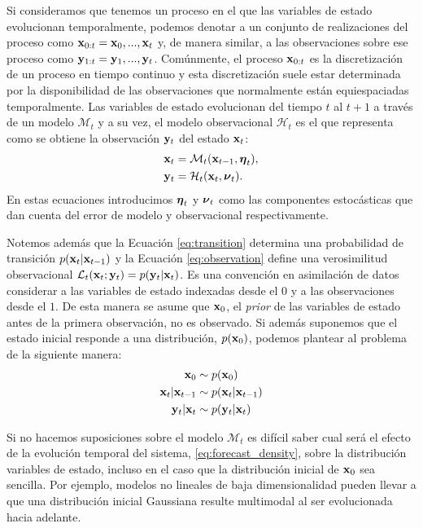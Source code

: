 Si consideramos que tenemos un proceso en el que las variables de estado evolucionan temporalmente, podemos denotar a un conjunto de realizaciones del proceso como $\mathbf{x}_{0:t} = \mathbf{x}_0, ..., \mathbf{x}_t$ y, de manera similar, a las observaciones sobre ese proceso como $\mathbf{y}_{1:t} = \mathbf{y}_1, ..., \mathbf{y}_t$. Comúnmente, el proceso $\mathbf{x}_{0:t}$ es la discretización de un proceso en tiempo continuo y esta discretización suele estar determinada por la disponibilidad de las observaciones que normalmente están equiespaciadas temporalmente. Las variables de estado evolucionan del tiempo $t$ al $t+1$ a través de un modelo $\mathcal{M}_t$ y a su vez, el modelo observacional $\mathcal{H}_t$ es el que representa como se obtiene la observación $\mathbf{y}_t$ del estado $\mathbf{x}_t$: 
\begin{align}
    \mathbf{x}_t &= \mathcal M_{t} (\mathbf{x}_{t-1}, \mbox{\boldmath$ \eta $}_t), \label{eq:transition} \\
    \mathbf{y}_t &= \mathcal H_{t} (\mathbf{x}_t, \mbox{\boldmath$ \nu $}_t). \label{eq:observation}
\end{align}
En estas ecuaciones introducimos $\mbox{\boldmath$ \eta $}_t$ y $\mbox{\boldmath$ \nu $}_t$ como las componentes estocásticas que dan cuenta del error de modelo y observacional respectivamente.

Notemos además que la Ecuación \ref{eq:transition} determina una probabilidad de transición $p(\mathbf{x}_t | \mathbf{x}_{t-1})$ y la Ecuación \ref{eq:observation} define una verosimilitud observacional $\mathcal{L}_t(\mathbf{x}_t ; \mathbf{y}_t) = p(\mathbf{y}_t | \mathbf{x}_t)$. Es una convención en asimilación de datos considerar a las variables de estado indexadas desde el $0$ y a las observaciones desde el $1$. De esta manera se asume que $\mathbf{x}_0$, el \textit{prior} de las variables de estado antes de la primera observación, no es observado. Si además suponemos que el estado inicial responde a una distribución, $p(\mathbf{x}_0)$, podemos plantear al problema de la siguiente manera:
\begin{align}
    \mathbf{x}_0 &\sim p(\mathbf{x}_0) \\
    \mathbf{x}_t | \mathbf{x}_{t-1} &\sim p(\mathbf{x}_t | \mathbf{x}_{t-1}) \label{eq:forecast_density}\\
    \mathbf{y}_t | \mathbf{x}_t &\sim p(\mathbf{y}_t | \mathbf{x}_t)
\end{align}

Si no hacemos suposiciones sobre el modelo $\mathcal{M}_t$ es difícil saber cual será el efecto de la evolución temporal del sistema, \ref{eq:forecast_density}, sobre la distribución variables de estado, incluso en el caso que la distribución inicial de $\mathbf{x}_0$ sea sencilla. Por ejemplo, modelos no lineales de baja dimensionalidad pueden llevar a que una distribución inicial Gaussiana resulte multimodal al ser evolucionada hacia adelante. 

